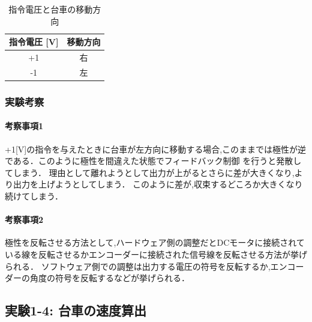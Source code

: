 \begin{table}[h]
  \centering
  \caption{指令電圧と台車の移動方向}
  \label{tab:command_voltage_direction}
  \begin{tabular}{|c|c|}
    \hline
    指令電圧 [V] & 移動方向 \\
    \hline
    +1           & 右       \\
    \hline
    -1           & 左       \\
    \hline
  \end{tabular}
\end{table}

\subsubsection{実験考察}
\paragraph{考察事項1}
+1[V]の指令を与えたときに台車が左方向に移動する場合,このままでは極性が逆である．このように極性を間違えた状態でフィードバック制御
を行うと発散してしまう．
理由として離れようとして出力が上がるとさらに差が大きくなり,より出力を上げようとしてしまう．
このように差が,収束するどころか大きくなり続けてしまう．

\paragraph{考察事項2}
極性を反転させる方法として,ハードウェア側の調整だとDCモータに接続されている線を反転させるかエンコーダーに接続された信号線を反転させる方法が挙げられる．
ソフトウェア側での調整は出力する電圧の符号を反転するか,エンコーダーの角度の符号を反転するなどが挙げられる．


\subsection{実験1-4: 台車の速度算出}

